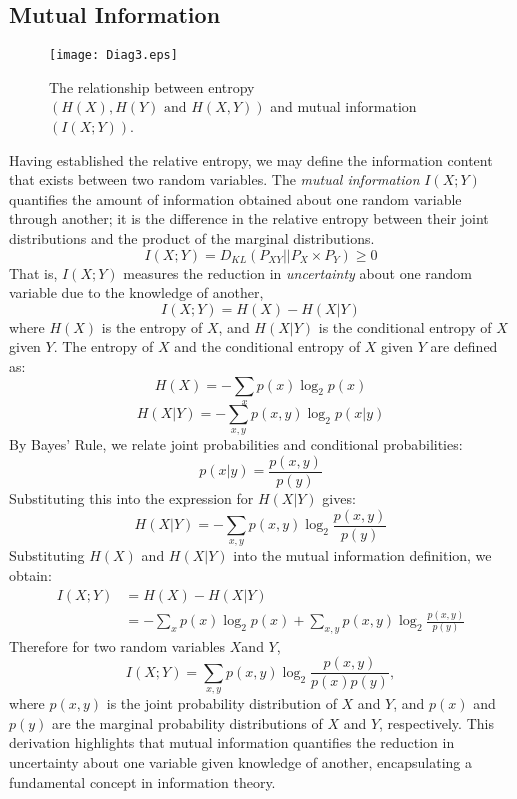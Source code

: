 \documentclass[journal,12pt,onecolumn,draftclsnofoot,]{IEEEtran}
\begin{document}
	\subsection{Mutual Information}
			\begin{figure}
		\centering
		\texttt{[image: Diag3.eps]} 
		\caption{The relationship between entropy $( H(X), H(Y) \text{ and } H(X,Y) )$ and mutual information $( I(X;Y) )$.}
	\end{figure}
	Having established the relative entropy, we may define the information content that exists between two random variables. The \emph{mutual information} \(I(X; Y)\) quantifies the amount of information obtained about one random variable through another; it is the difference in the relative entropy between their joint distributions and the product of the marginal distributions. 
	\[I(X; Y) = D_{KL} ( P_{XY} || P_{X} \times P_{Y}  ) \geq 0  \]
	That is, \(I(X; Y)\) measures the reduction in \emph{uncertainty}	about one random variable due to the knowledge of another,
	\[I(X; Y) = H(X) - H(X|Y)\]
	where \(H(X)\)     is the entropy of \(X\), and \(H(X|Y)\) is the conditional entropy of \(X\) given \(Y\). The entropy of \(X\) and the conditional entropy of \(X\)  given \(Y\) are defined as:
	\[H(X) = -\sum_{x} p(x) \log_2 p(x)\]
	\[H(X|Y) = -\sum_{x,y} p(x,y) \log_2 p(x|y)\]
	By Bayes' Rule, we relate joint probabilities and conditional probabilities:
	\[p(x|y) = \frac{p(x,y)}{p(y)}\]
	Substituting this into the expression for \(H(X|Y)\) gives:
	\[H(X|Y) = -\sum_{x,y} p(x,y) \log_2 \frac{p(x,y)}{p(y)}\]
	Substituting \(H(X)\) and \(H(X|Y)\) into the mutual information definition, we obtain:
	\[
	\begin{aligned}
		I(X; Y) &= H(X) - H(X|Y) \\
		&= -\sum_{x} p(x) \log_2 p(x) + \sum_{x,y} p(x,y) \log_2 \frac{p(x,y)}{p(y)} 
	\end{aligned}
	\]
	Therefore for two random variables \(X\)and \(Y\), 
	\begin{equation}
		I(X; Y) = \sum_{x,y} p(x,y) \log_2 \frac{p(x,y)}{p(x)p(y)},
	\end{equation}
	where \(p(x,y)\) is the joint probability distribution of \(X\) and \(Y\), and \(p(x)\) and \(p(y)\) are the marginal probability distributions of \(X\) and \(Y\), respectively. This derivation highlights that mutual information quantifies the reduction in uncertainty about one variable given knowledge of another, encapsulating a fundamental concept in information theory.
\end{document}
